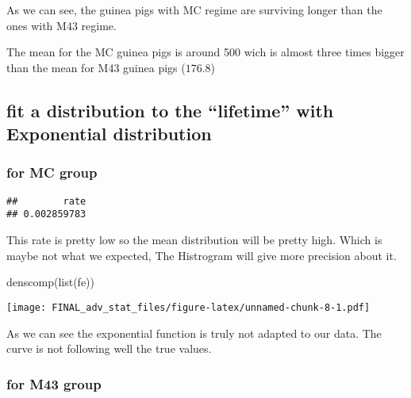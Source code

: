 \documentclass[
]{article}
\newenvironment{Shaded}{\begin{snugshade}}{\end{snugshade}}
\newcommand{\FunctionTok}[1]{\textcolor[rgb]{0.00,0.00,0.00}{#1}}
\newcommand{\NormalTok}[1]{#1}
\newcommand{\OtherTok}[1]{\textcolor[rgb]{0.56,0.35,0.01}{#1}}
\newcommand{\SpecialCharTok}[1]{\textcolor[rgb]{0.00,0.00,0.00}{#1}}
\newcommand{\StringTok}[1]{\textcolor[rgb]{0.31,0.60,0.02}{#1}}
\begin{document}
As we can see, the guinea pigs with MC regime are surviving longer than
the ones with M43 regime.

The mean for the MC guinea pigs is around 500 wich is almost three times
bigger than the mean for M43 guinea pigs (\(176.8\))

\hypertarget{fit-a-distribution-to-the-lifetime-with-exponential-distribution}{%
\subsection{fit a distribution to the ``lifetime'' with Exponential
distribution}\label{fit-a-distribution-to-the-lifetime-with-exponential-distribution}}

\hypertarget{for-mc-group}{%
\subsubsection{for MC group}\label{for-mc-group}}

\begin{Shaded}
\end{Shaded}

\begin{verbatim}
##        rate 
## 0.002859783
\end{verbatim}

This rate is pretty low so the mean distribution will be pretty high.
Which is maybe not what we expected, The Histrogram will give more
precision about it.

\begin{Shaded}
\begin{Highlighting}[]
\FunctionTok{denscomp}\NormalTok{(}\FunctionTok{list}\NormalTok{(fe))}
\end{Highlighting}
\end{Shaded}

\texttt{[image: FINAL\_adv\_stat\_files/figure-latex/unnamed-chunk-8-1.pdf]}

As we can see the exponential function is truly not adapted to our data.
The curve is not following well the true values.

\hypertarget{for-m43-group}{%
\subsubsection{for M43 group}\label{for-m43-group}}
\end{document}
